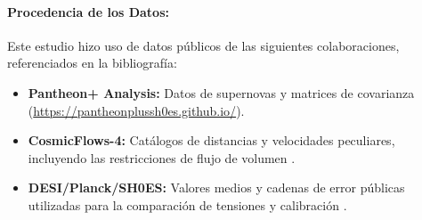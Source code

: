 \documentclass[12pt, a4paper]{article}
\theoremstyle{plain}
\theoremstyle{definition}
\begin{document}
\paragraph{Procedencia de los Datos:}
Este estudio hizo uso de datos públicos de las siguientes colaboraciones, referenciados en la bibliografía:
\begin{itemize}
    \item \textbf{Pantheon+ Analysis:} Datos de supernovas y matrices de covarianza \cite{Brout2022} \\ (\url{https://pantheonplussh0es.github.io/}).
    \item \textbf{CosmicFlows-4:} Catálogos de distancias y velocidades peculiares, incluyendo las restricciones de flujo de volumen \cite{Tully2023, Mazurenko2024}.
    \item \textbf{DESI/Planck/SH0ES:} Valores medios y cadenas de error públicas utilizadas para la comparación de tensiones y calibración \cite{DESI2024, Planck2018, Riess2022}.
\end{itemize}
\end{document}
